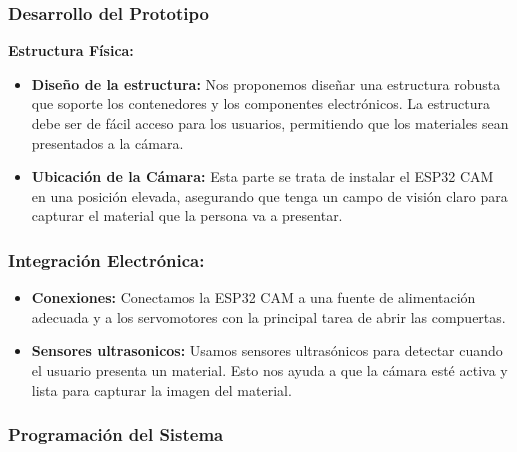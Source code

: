 

\subsubsection{Desarrollo del Prototipo}

\textbf{Estructura Física:}
\begin{itemize}
    \item \textbf{Diseño de la estructura:} Nos proponemos diseñar una estructura robusta que soporte los contenedores y los componentes electrónicos. 
    La estructura debe ser de fácil acceso para los usuarios, permitiendo que los materiales sean presentados a la cámara.

    \item \textbf{Ubicación de la Cámara:} Esta parte se trata de instalar el ESP32 CAM en una posición elevada, asegurando que tenga un campo de visión claro para capturar el material que la persona va a presentar.
\end{itemize}


\subsubsection{Integración Electrónica:}
\begin{itemize}
    \item \textbf{Conexiones:} Conectamos la ESP32 CAM a una fuente de alimentación adecuada y a los servomotores con la principal tarea de abrir las compuertas.
    \item \textbf{Sensores ultrasonicos:} Usamos sensores ultrasónicos para detectar cuando el usuario presenta un material. Esto nos ayuda a que la cámara esté activa y lista para capturar la imagen del material.
\end{itemize}


\subsubsection{Programación del Sistema}

